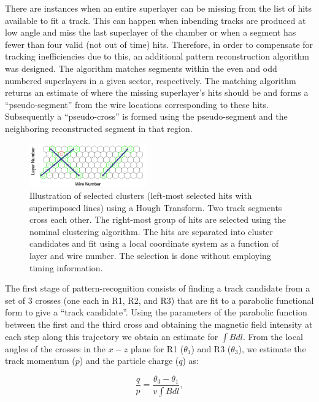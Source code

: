 There are instances when an entire superlayer can be missing from the list of hits available to fit a track. 
This can happen when inbending tracks are produced at low angle and miss the last superlayer of the chamber or when a segment has fewer than four valid (not out of time) hits. Therefore, in order to compensate for tracking inefficiencies due to this, an additional pattern reconstruction algorithm was designed.  The algorithm matches segments within the even and odd numbered superlayers
in a given sector, respectively. The matching
algorithm returns an estimate of where the missing superlayer's hits should be and forms a ``pseudo-segment'' from
the wire locations corresponding to these hits. Subsequently a ``pseudo-cross'' is formed using the pseudo-segment
and the neighboring reconstructed segment in that region.

\begin{figure}
\includegraphics[width=0.45\textwidth]{pics/dcPattern14.png}
\caption{Illustration of selected clusters (left-most selected hits with superimposed lines) using a Hough Transform.
  Two track segments cross each other. The right-most group of hits are selected using the nominal clustering algorithm.  The hits are separated into cluster candidates and fit using a local coordinate
  system as a function of layer and wire number. The selection is done without employing timing information.}
\label{fig:hough}
\end{figure}

The first stage of pattern-recognition consists of finding a track candidate from a set of 3 crosses (one each in R1,
R2, and R3) that are fit to a parabolic functional form to give a ``track candidate''. Using the parameters of the
parabolic function between the first and the third cross and obtaining the magnetic field intensity at each step along
this trajectory we obtain an estimate for $\int B dl$. From the local angles of the crosses in the $x-z$ plane for R1
($\theta_1$) and R3 ($\theta_3$), we estimate the track momentum ($p$) and the particle charge ($q$) as:

\begin{equation}
  \frac{q}{p} = \frac{\theta_3 - \theta_1}{v\int{B dl}},
\end{equation}


